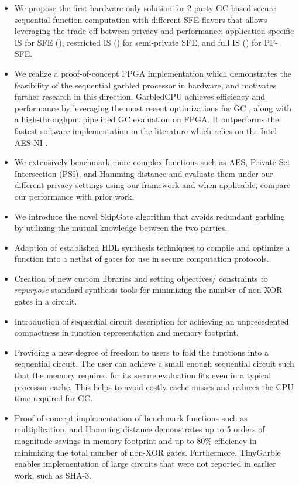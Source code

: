 \begin{itemize}
\item We propose the first hardware-only solution for 2-party GC-based secure sequential function computation with different SFE flavors that allows leveraging the trade-off between privacy and performance: application-specific IS for SFE (), restricted IS () for semi-private SFE, and full IS () for PF-SFE.
\item We realize a proof-of-concept FPGA implementation which demonstrates the feasibility of the sequential garbled processor in hardware, and motivates further research in this direction. GarbledCPU achieves efficiency and performance by leveraging the most recent optimizations for GC \cite{kolesnikov2008improved,bellare2013efficient,zahur2015two,songhori2015tinygarble}, along with a high-throughput pipelined GC evaluation on FPGA. It outperforms the fastest software implementation in the literature which relies on the Intel AES-NI \cite{bellare2013efficient}.
\item We extensively benchmark more complex functions such as AES, Private Set Intersection (PSI), and Hamming distance and evaluate them under our different privacy settings using our framework and when applicable, compare our performance with prior work.
\item We introduce the novel SkipGate algorithm that avoids redundant garbling by utilizing the mutual knowledge between the two parties.
\item
  Adaption of established HDL synthesis techniques to compile and optimize a function into a netlist of gates for use in secure computation protocols.
\item
  Creation of new custom libraries and setting objectives/ constraints to \emph{repurpose} standard synthesis tools for minimizing the number of non-XOR gates in a circuit.
\item
  Introduction of sequential circuit description for achieving an unprecedented compactness in function representation and memory footprint.
\item
  Providing a new degree of freedom to users to fold the functions into a sequential circuit.
  The user can achieve a small enough sequential circuit such that the memory required for its secure evaluation fits even in a typical processor cache.
  This helps to avoid costly cache misses and reduces the CPU time required for GC.
\item
  Proof-of-concept implementation of benchmark functions such as multiplication, and Hamming distance demonstrates up to 5 orders of magnitude savings in memory footprint and up to $80\%$ efficiency in minimizing the total number of non-XOR gates.
  Furthermore, TinyGarble enables implementation of large circuits that were not reported in earlier work, such as SHA-3.%


\end{itemize}
